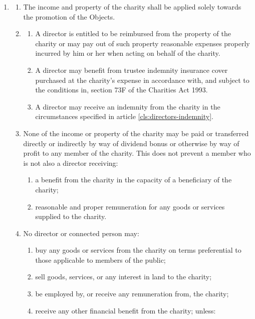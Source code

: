 \begin{enumerate}
\item
  \label{cls:income-property}
  \begin{enumerate}
  \item
    The income and property of the charity shall be applied solely
    towards the promotion of the Objects.
  \item
    \label{scls:director-reimburse}
    \begin{enumerate}
    \item
      A director is entitled to be reimbursed from the property of the
      charity or may pay out of such property reasonable expenses
      properly incurred by him or her when acting on behalf of the
      charity.
    \item
      A director may benefit from trustee indemnity insurance cover
      purchased at the charity's expense in accordance with, and subject
      to the conditions in, section 73F of the Charities Act 1993.
    \item
      A director may receive an indemnity from the charity in the
      circumstances specified in article \ref{cls:directors-indemnity}.
    \end{enumerate}
  \item
    None of the income or property of the charity may be paid or
    transferred directly or indirectly by way of dividend bonus or
    otherwise by way of profit to any member of the charity. This does
    not prevent a member who is not also a director receiving:
    \begin{enumerate}
    \item
      a benefit from the charity in the capacity of a beneficiary of the
      charity;
    \item
      reasonable and proper remuneration for any goods or services
      supplied to the charity.
    \end{enumerate}
  \item
    \label{scls:directors-remuneration} No director or connected person
    may:
    \begin{enumerate}
    \item
      buy any goods or services from the charity on terms preferential to
      those applicable to members of the public;
    \item
      sell goods, services, or any interest in land to the charity;
    \item
      be employed by, or receive any remuneration from, the charity;
    \item
      receive any other financial benefit from the charity; unless:

\end{enumerate}
\end{enumerate}
\end{enumerate}
